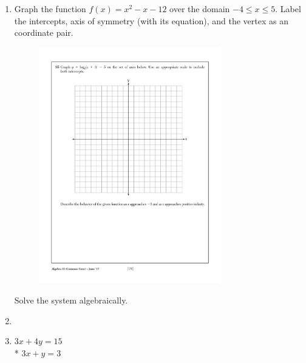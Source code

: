 \documentclass[12pt, twoside]{article}
\begin{document}
\begin{enumerate}
\newpage
\item Graph the function $f(x)=x^2-x-12$ over the domain $-4 \leq x \leq 5$. Label the intercepts, axis of symmetry (with its equation), and the vertex as an coordinate pair.

    \begin{figure}[!ht]
        \centering
        \includegraphics[width=0.75\textwidth]{regents-grid.pdf}
  \end{figure}

Solve the system algebraically.
\item \item
$3x+4y=15$\\*
$3x+y=3$


\end{enumerate}
\end{document}
